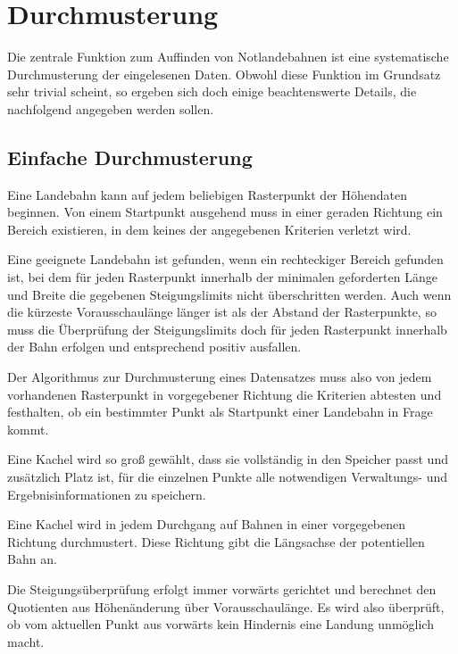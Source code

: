 \documentclass[
11pt, %
a4paper, %
oneside, %
pdfspacing, %
headinclude,
BCOR5mm, %
ngerman, %
bibtotocnumbered,
]{scrartcl}
\begin{document}
\section{Durchmusterung}

Die zentrale Funktion zum Auffinden von Notlandebahnen ist eine systematische Durchmusterung der eingelesenen Daten. Obwohl diese Funktion im Grundsatz sehr trivial scheint, so ergeben sich doch einige beachtenswerte Details, die nachfolgend angegeben werden sollen.

\subsection{Einfache Durchmusterung}
Eine Landebahn kann auf jedem beliebigen Rasterpunkt der Höhendaten beginnen. Von einem Startpunkt ausgehend muss in einer geraden Richtung ein Bereich existieren, in dem keines der angegebenen Kriterien verletzt wird. 

Eine geeignete Landebahn ist gefunden, wenn ein rechteckiger Bereich gefunden ist, bei dem für jeden Rasterpunkt innerhalb der minimalen geforderten Länge und Breite die gegebenen Steigungslimits nicht überschritten werden.
Auch wenn die kürzeste Vorausschaulänge länger ist als der Abstand der Rasterpunkte, so muss die Überprüfung der Steigungslimits doch für jeden Rasterpunkt innerhalb der Bahn erfolgen und entsprechend positiv ausfallen.

Der Algorithmus zur Durchmusterung eines Datensatzes muss also von jedem vorhandenen Rasterpunkt in vorgegebener Richtung die Kriterien abtesten und festhalten, ob ein bestimmter Punkt als Startpunkt einer Landebahn in Frage kommt.

Eine Kachel wird so groß gewählt, dass sie vollständig in den Speicher passt und zusätzlich Platz ist, für die einzelnen Punkte alle notwendigen Verwaltungs- und Ergebnisinformationen zu speichern.

Eine Kachel wird in jedem Durchgang auf Bahnen in einer vorgegebenen Richtung durchmustert. Diese Richtung gibt die Längsachse der potentiellen Bahn an.

Die Steigungsüberprüfung erfolgt immer vorwärts gerichtet und berechnet den Quotienten aus Höhenänderung über Vorausschaulänge. Es wird also überprüft, ob vom aktuellen Punkt aus vorwärts kein Hindernis eine Landung unmöglich macht.
\end{document}
